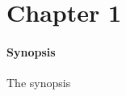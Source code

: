 \graphicspath{{ch1_introduction/}{Figures/}}

\chapter{Chapter 1}
\label{chapter:chapter1}




\subsubsection{Synopsis}The synopsis

